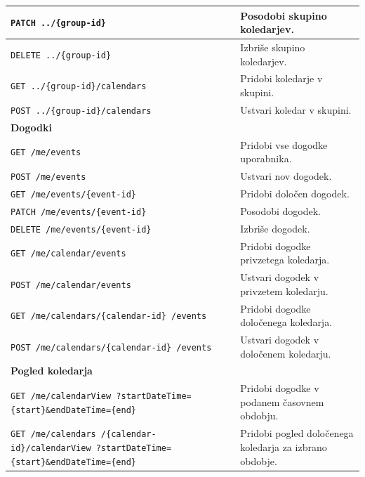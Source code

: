 \documentclass[a4paper, 12pt]{book}
\begin{document}
\begin{longtable}{|p{7cm}|p{7.5cm}|}
\texttt{PATCH ../\{group-id\}} &
Posodobi skupino koledarjev. \\
\hline

\texttt{DELETE ../\{group-id\}} &
Izbriše skupino koledarjev. \\
\hline

\texttt{GET ../\{group-id\}/calendars} &
Pridobi koledarje v skupini. \\
\hline

\texttt{POST ../\{group-id\}/calendars} &
Ustvari koledar v skupini. \\
\hline

\multicolumn{2}{|l|}{\textbf{Dogodki}} \\
\hline

\texttt{GET /me/events} &
Pridobi vse dogodke uporabnika. \\
\hline

\texttt{POST /me/events} &
Ustvari nov dogodek. \\
\hline

\texttt{GET /me/events/\{event-id\}} &
Pridobi določen dogodek. \\
\hline

\texttt{PATCH /me/events/\{event-id\}} &
Posodobi dogodek. \\
\hline

\texttt{DELETE /me/events/\{event-id\}} &
Izbriše dogodek. \\
\hline

\texttt{GET /me/calendar/events} &
Pridobi dogodke privzetega koledarja. \\
\hline

\texttt{POST /me/calendar/events} &
Ustvari dogodek v privzetem koledarju. \\
\hline

\texttt{GET /me/calendars/\{calendar-id\}
/events} &
Pridobi dogodke določenega koledarja. \\
\hline

\texttt{POST /me/calendars/\{calendar-id\}
/events} &
Ustvari dogodek v določenem koledarju. \\
\hline

\multicolumn{2}{|l|}{\textbf{Pogled koledarja}} \\
\hline

\texttt{GET /me/calendarView
?startDateTime=\{start\}\&endDateTime=\{end\}} &
Pridobi dogodke v podanem časovnem obdobju. \\
\hline

\texttt{GET /me/calendars
/\{calendar-id\}/calendarView
?startDateTime=\{start\}\&endDateTime=\{end\}} &
Pridobi pogled določenega koledarja za izbrano obdobje. \\
\hline


\end{longtable}
\end{document}
